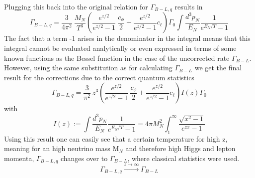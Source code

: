Plugging this back into the original relation for $\Gamma_{B-L,q}$ results in
\begin{equation*}
\Gamma_{B-L,q}=\frac{3}{4\pi^2}\:\frac{M_N}{T^3}\left(\frac{e^{z/2}}{e^{z/2}-1}\:\frac{c_\phi}{2}+\frac{e^{z/2}}{e^{z/2}-1}c_\ell\right)\Gamma_0\int \frac{d^3p_N}{E_N}\frac{1}{e^{E_N/T}-1}
\end{equation*}
The fact that a term -1 arises in the denominator in the integral means that this integral cannot be evaluated analytically or even expressed in terms of some known functions as the Bessel function in the case of the uncorrected rate $\Gamma_{B-L}$. However, using the same substitution as for calculating $\Gamma_{B-L}$ we get the final result for the corrections due to the correct quantum statistics
\begin{equation*}
	\Gamma_{B-L,q}=\frac{3}{\pi^2}\:z^3\left(\frac{e^{z/2}}{e^{z/2}-1}\:\frac{c_\phi}{2}+\frac{e^{z/2}}{e^{z/2}-1}c_\ell\right)I(z)\Gamma_0
\end{equation*}
with 
\begin{equation*}
	I(z):=\int \frac{d^3p_N}{E_N}\frac{1}{e^{E_N/T}-1}=4\pi M_N^2\int_{1}^{\infty}\frac{\sqrt{x^2-1}}{e^{zx}-1}
\end{equation*}
Using this result one can easily see that a certain temperature for high z, meaning for an high neutrino mass M$_N$ and therefore high Higgs and lepton momenta, $\Gamma_{B-L,q}$ changes over to $\Gamma_{B-L}$, where classical statistics were used.
\begin{equation*}
	\Gamma_{B-L,q}\overset{z\rightarrow\infty}{\longrightarrow}\Gamma_{B-L}
\end{equation*}